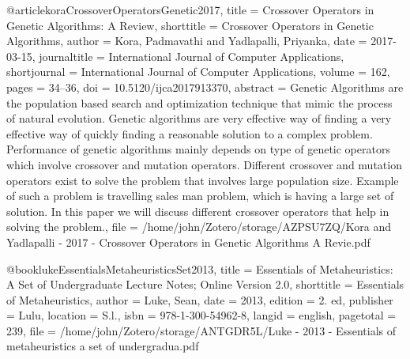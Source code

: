 \begin{thebibliography}
@article{koraCrossoverOperatorsGenetic2017,
  title = {Crossover {{Operators}} in {{Genetic Algorithms}}: {{A Review}}},
  shorttitle = {Crossover {{Operators}} in {{Genetic Algorithms}}},
  author = {Kora, Padmavathi and Yadlapalli, Priyanka},
  date = {2017-03-15},
  journaltitle = {International Journal of Computer Applications},
  shortjournal = {International Journal of Computer Applications},
  volume = {162},
  pages = {34--36},
  doi = {10.5120/ijca2017913370},
  abstract = {Genetic Algorithms are the population based search and optimization technique that mimic the process of natural evolution. Genetic algorithms are very effective way of finding a very effective way of quickly finding a reasonable solution to a complex problem. Performance of genetic algorithms mainly depends on type of genetic operators which involve crossover and mutation operators. Different crossover and mutation operators exist to solve the problem that involves large population size. Example of such a problem is travelling sales man problem, which is having a large set of solution. In this paper we will discuss different crossover operators that help in solving the problem.},
  file = {/home/john/Zotero/storage/AZPSU7ZQ/Kora and Yadlapalli - 2017 - Crossover Operators in Genetic Algorithms A Revie.pdf}
}

@book{lukeEssentialsMetaheuristicsSet2013,
  title = {Essentials of Metaheuristics: A Set of Undergraduate Lecture Notes; {{Online Version}} 2.0},
  shorttitle = {Essentials of Metaheuristics},
  author = {Luke, Sean},
  date = {2013},
  edition = {2. ed},
  publisher = {{Lulu}},
  location = {{S.l.}},
  isbn = {978-1-300-54962-8},
  langid = {english},
  pagetotal = {239},
  file = {/home/john/Zotero/storage/ANTGDR5L/Luke - 2013 - Essentials of metaheuristics a set of undergradua.pdf}
}


\end{thebibliography}
